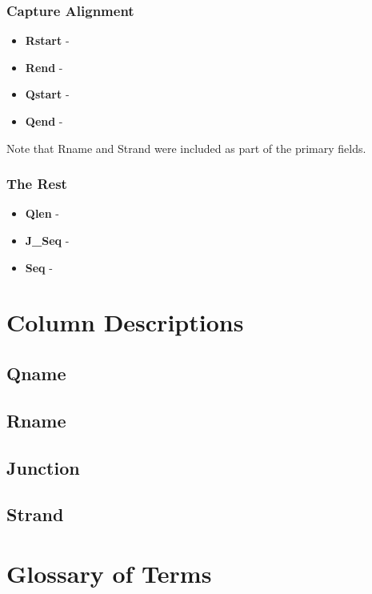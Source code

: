 \documentclass{article}
\begin{document}
\subsubsection*{Capture Alignment}
\begin{itemize}
  \item \textbf{Rstart} - 
  \item \textbf{Rend} - 
  \item \textbf{Qstart} - 
  \item \textbf{Qend} - 
\end{itemize}
Note that Rname and Strand were included as part of the primary fields.


\subsubsection*{The Rest}
\begin{itemize}
  \item \textbf{Qlen} - 
  \item \textbf{J\_Seq} - 
  \item \textbf{Seq} - 
\end{itemize}

\section{Column Descriptions}
\subsection*{Qname}
\subsection*{Rname}
\subsection*{Junction}
\subsection*{Strand}


\section{Glossary of Terms}
\end{document}
